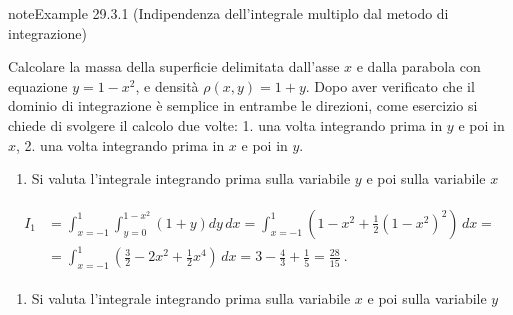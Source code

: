 \documentclass[letterpaper,10pt,italian]{jupyterBook}
\begin{document}
\begin{sphinxadmonition}{note}{Example 29.3.1 (Indipendenza dell’integrale multiplo dal metodo di integrazione)}



\sphinxAtStartPar
Calcolare la massa della superficie delimitata dall’asse \(x\) e dalla parabola con equazione \(y = 1 - x^2\), e densità \(\rho(x,y) = 1 + y\). Dopo aver verificato che il dominio di integrazione è semplice in entrambe le direzioni, come esercizio si chiede di svolgere il calcolo due volte: 1. una volta integrando prima in \(y\) e poi in \(x\), 2. una volta integrando prima in \(x\) e poi in \(y\).

\sphinxAtStartPar
{} 
\begin{enumerate}
%
\item {} 
\sphinxAtStartPar
Si valuta l’integrale integrando prima sulla variabile \(y\) e poi sulla variabile \(x\)

\end{enumerate}
\begin{equation*}
\begin{split}\begin{aligned}
I_1 
& = \int_{x=-1}^{1} \int_{y=0}^{1-x^2} \left( 1 + y \right) dy \, dx 
  = \int_{x=-1}^{1} \left( 1-x^2 + \frac{1}{2} (1-x^2)^2 \right) \, dx = \\ 
& = \int_{x=-1}^{1} \left( \frac{3}{2} - 2 x^2 + \frac{1}{2} x^4 \right) \, dx      
  = 3 - \frac{4}{3} + \frac{1}{5} = \frac{28}{15} \ . 
\end{aligned}\end{split}
\end{equation*}

\begin{enumerate}
%
\setcounter{enumi}{1}
\item {} 
\sphinxAtStartPar
Si valuta l’integrale integrando prima sulla variabile \(x\) e poi sulla variabile \(y\)


\end{enumerate}
\end{sphinxadmonition}
\end{document}
